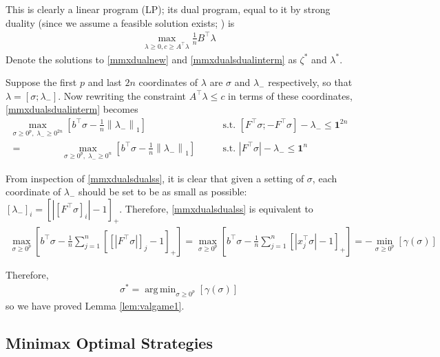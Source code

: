 \documentclass{colt2015} %
\DeclareMathOperator*{\argmin}{arg\,min}
\newcommand{\vnorm}[1]{\left\lVert#1\right\rVert} %
\newcommand{\ifn}{\mathbf{1}} %
\newcommand{\abs}[1]{\left| #1 \right|}
\begin{document}
This is clearly a linear program (LP); its dual program, equal to it by strong duality 
(since we assume a feasible solution exists; \cite{V96}) is 
\begin{align}
\label{mmxdualsdualinterm}
\max_{\lambda \geq 0, c \geq A^\top \lambda} \frac{1}{n} B^\top \lambda
\end{align}
Denote the solutions to \eqref{mmxdualnew} and \eqref{mmxdualsdualinterm} as $\zeta^*$ and $\lambda^*$. 

Suppose the first $p$ and last $2n$ coordinates of $\lambda$ are 
$\sigma$ and $\lambda_{-}$ respectively, 
so that $\lambda = [\sigma; \lambda_{-} ]$.
Now rewriting the constraint $A^\top \lambda \leq c$ in terms of these coordinates,
\eqref{mmxdualsdualinterm} becomes 
\begin{align}
\label{mmxdualsdual}
\max_{\sigma \geq 0^p, \;\lambda_{-} \geq 0^{2n}} \left[ b^\top \sigma - \frac{1}{n} \vnorm{\lambda_{-}}_1 \right] \qquad &\mbox{s.t.  } 
[F^\top \sigma; - F^\top \sigma] - \lambda_{-} \leq \ifn^{2n} \\
= \qquad \qquad
\label{mmxdualsdualss}
\max_{\sigma \geq 0^p, \;\lambda_{-} \geq 0^{n}} \left[ b^\top \sigma - \frac{1}{n} \vnorm{\lambda_{-}}_1 \right] \qquad &\mbox{s.t.  } 
\abs{F^\top \sigma} - \lambda_{-} \leq \ifn^{n}
\end{align}

From inspection of \eqref{mmxdualsdualss}, 
it is clear that given a setting of $\sigma$, 
each coordinate of $\lambda_{-}$ should be set to be as small as possible: 
$[\lambda_{-}]_{i} = \left[ \abs{[F^\top \sigma]_{i}} - 1 \right]_{+}$. 
Therefore, \eqref{mmxdualsdualss} is equivalent to
\begin{align*}
\max_{\sigma \geq 0^p} \left[ b^\top \sigma - \frac{1}{n} \sum_{j=1}^n \left[ [\abs{F^\top \sigma}]_{j} - 1 \right]_{+} \right] 
= \max_{\sigma \geq 0^p} \left[ b^\top \sigma - \frac{1}{n} \sum_{j=1}^n \left[ \abs{x_{j}^\top \sigma} - 1 \right]_{+} \right] 
= - \min_{\sigma \geq 0^p} \left[ \gamma (\sigma) \right]
\end{align*}

Therefore,
\begin{align}
\label{optsgma}
\sigma^* = \argmin_{\sigma \geq 0^p} \left[ \gamma (\sigma) \right]
\end{align}
so we have proved Lemma \ref{lem:valgame1}.


\subsection{Minimax Optimal Strategies}
\label{sec:optStrategies}
\end{document}
